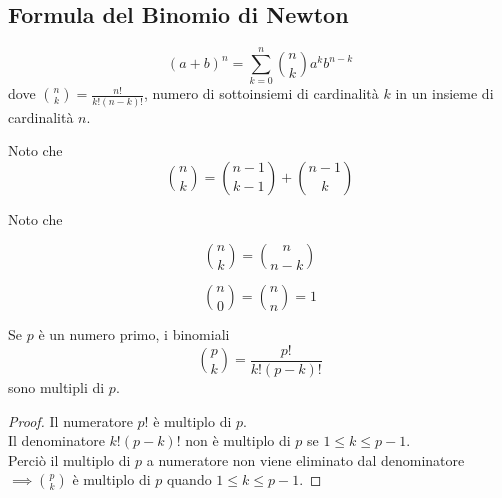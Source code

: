 \documentclass[a4paper,12pt, oneside]{book}
\begin{document}
\subsection{Formula del Binomio di Newton}
\begin{definizione}
	$$(a+b)^n = \sum_{k=0}^{n} \binom{n}{k} a^{k} b^{n-k}$$
	dove $\binom{n}{k} = \frac{n!}{k!(n-k)!}$, numero di sottoinsiemi di cardinalità $k$ in un insieme di cardinalità $n$.
\end{definizione}
\begin{nota}Noto che
	$$\binom{n}{k} = \binom{n-1}{k-1} + \binom{n-1}{k}$$
\end{nota}
\begin{nota}
	Noto che \\

	\begin{minipage}{0.45\textwidth}
		$$\binom{n}{k} = \binom{n}{n-k}$$
	\end{minipage}%
	\hfill
	\begin{minipage}{0.45\textwidth}
		$$\binom{n}{0} = \binom{n}{n} = 1$$
	\end{minipage}%

\end{nota}
\begin{nota}
	Se $p$ è un numero primo, i binomiali $$\binom{p}{k} = \frac{p!}{k!(p-k)!}$$ sono multipli di $p$.
	\begin{proof}
		Il numeratore $p!$ è multiplo di $p$.\\
		Il denominatore $k!(p-k)!$ non è multiplo di $p$ se $1 \leq k \leq p-1$.\\
		Perciò il multiplo di $p$ a numeratore non viene eliminato dal denominatore
		$\implies \binom{p}{k}$ è multiplo di $p$ quando $1 \leq k \leq p-1$.
	\end{proof}
\end{nota}
\end{document}
